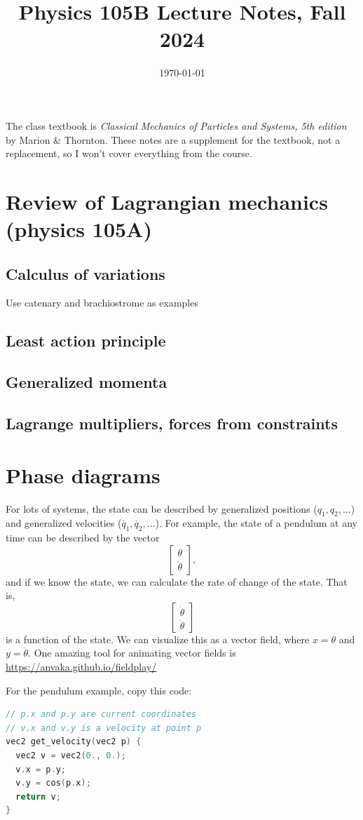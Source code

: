 \documentclass{article}
\date{\today}
\title{Physics 105B Lecture Notes, Fall 2024}
\begin{document}
\maketitle

The class textbook is \textit{Classical Mechanics of Particles and Systems, 5th edition} by Marion \& Thornton. These notes are a supplement for the textbook, not a replacement, so I won't cover everything from the course.

\tableofcontents
\section{Review of Lagrangian mechanics (physics 105A)}
\subsection{Calculus of variations}
Use catenary and brachiostrome as examples
\subsection{Least action principle}
\subsection{Generalized momenta}
\subsection{Lagrange multipliers, forces from constraints}

\section{Phase diagrams}
For lots of systems, the state can be described by generalized positions ($q_1, q_2, \dots$) and generalized velocities ($\dot{q_1}, \dot{q_2}, \dots$). For example, the state of a pendulum at any time can be described by the vector
\[ \begin{bmatrix}
    \theta \\
    \dot{\theta}
\end{bmatrix}, \]
and if we know the state, we can calculate the rate of change of the state. That is,
\[ \begin{bmatrix}
    \dot{\theta} \\
    \ddot{\theta}
\end{bmatrix} \]
is a function of the state. We can visualize this as a vector field, where $x = \theta$ and $y = \dot{\theta}$. One amazing tool for animating vector fields is
\url{https://anvaka.github.io/fieldplay/}
\par
For the pendulum example, copy this code:
\begin{lstlisting}[language=C,frame=single]
// p.x and p.y are current coordinates
// v.x and v.y is a velocity at point p
vec2 get_velocity(vec2 p) {
  vec2 v = vec2(0., 0.);
  v.x = p.y;
  v.y = cos(p.x);
  return v;
}
\end{lstlisting}
\end{document}
